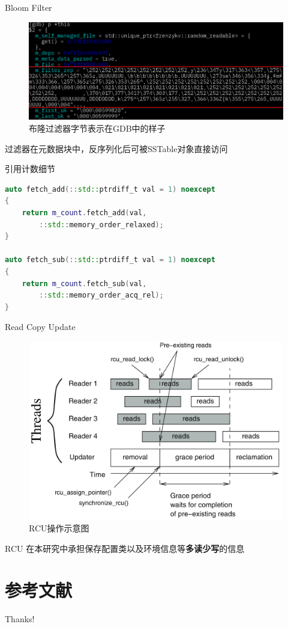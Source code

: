 \documentclass{beamer}
\begin{document}
\begin{frame}{Bloom Filter}
    \begin{figure}
        \centering
        \includegraphics[width=0.9\linewidth]{pic/bloom-rep.png}
        \caption{布隆过滤器字节表示在GDB中的样子}
    \end{figure}
    过滤器在元数据块中，反序列化后可被SSTable对象直接访问
\end{frame}

\begin{frame}[fragile]{引用计数细节}\label{frm:refcount}
    \begin{minipage}{1\linewidth}
\begin{lstlisting}[language=C++]
auto fetch_add(::std::ptrdiff_t val = 1) noexcept
{
    return m_count.fetch_add(val, 
        ::std::memory_order_relaxed);
}

auto fetch_sub(::std::ptrdiff_t val = 1) noexcept
{
    return m_count.fetch_sub(val, 
        ::std::memory_order_acq_rel);
}
\end{lstlisting}
    \end{minipage}\hspace{1cm}
\end{frame}

\begin{frame}{Read Copy Update}
    \begin{figure}
        \centering
        \includegraphics[width=0.6\linewidth]{pic/rcu.png}
        \caption{RCU操作示意图}
    \end{figure}
    RCU\cite{desnoyers_user-level_2011}
    在本研究中承担保存配置类以及环境信息等\textbf{多读少写}的信息
\end{frame}

\section{参考文献}

\begin{frame}[allowframebreaks]
    
    \tiny
\end{frame}

\begin{frame}
    \begin{center}
        {\Huge\calligra Thanks!}
    \end{center}
\end{frame}
\end{document}
